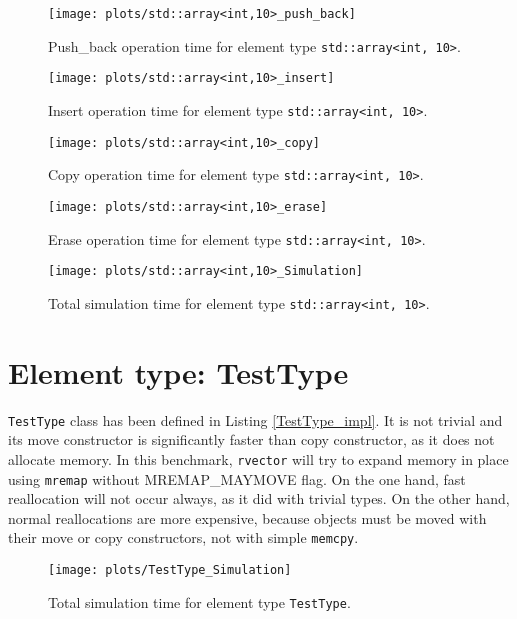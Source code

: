 \documentclass[inz, english, shortabstract]{iithesis}
\begin{document}
\begin{figure}[h!]
\texttt{[image: plots/std::array<int,10>\_push\_back]}
\caption{Push\_back operation time for element type \lstinline{std::array<int, 10>}.}
\label{array_push_back}
\end{figure}

\begin{figure}[h!]
\texttt{[image: plots/std::array<int,10>\_insert]}
\caption{Insert operation time for element type \lstinline{std::array<int, 10>}.}
\label{array_insert}
\end{figure}

\begin{figure}[h!]
\texttt{[image: plots/std::array<int,10>\_copy]}
\caption{Copy operation time for element type \lstinline{std::array<int, 10>}.}
\label{array_copy}
\end{figure}

\begin{figure}[h!]
\texttt{[image: plots/std::array<int,10>\_erase]}
\caption{Erase operation time for element type \lstinline{std::array<int, 10>}.}
\label{array_erase}
\end{figure}

\begin{figure}[h!]
\texttt{[image: plots/std::array<int,10>\_Simulation]}
\caption{Total simulation time for element type \lstinline{std::array<int, 10>}.}
\label{array_simulation}
\end{figure}

\clearpage
\section{Element type: TestType}
{\tt TestType} class has been defined in Listing \ref{TestType_impl}. It is not trivial and its move constructor is significantly faster than copy constructor, as it does not allocate memory. In this benchmark, {\tt rvector} will try to expand memory in place using {\tt mremap} without MREMAP\_MAYMOVE flag. On the one hand, fast reallocation will not occur always, as it did with trivial types. On the other hand, normal reallocations are more expensive, because objects must be moved with their move or copy constructors, not with simple {\tt memcpy}.

\begin{figure}[h!]
\texttt{[image: plots/TestType\_Simulation]}
\caption{Total simulation time for element type \lstinline{TestType}.}
\label{TestType_push_back}
\end{figure}
\end{document}

